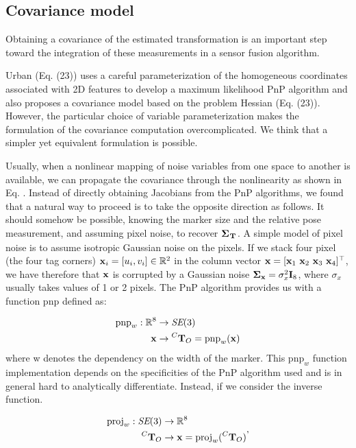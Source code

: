 \subsection{Covariance model}
\label{sec:apritlag_covariance}
Obtaining a covariance of the estimated transformation is an important step toward the integration of these measurements in a sensor fusion algorithm.

Urban \cite{urban2016mlpnp} (Eq. (23)) uses a careful parameterization of the homogeneous coordinates associated with 2D features to develop
a maximum likelihood PnP algorithm and also proposes a covariance model based on the problem Hessian (Eq. (23)).  However, the particular choice of variable 
parameterization makes the formulation of the covariance computation overcomplicated.
We think that a simpler yet equivalent formulation is possible. 

Usually, when a nonlinear mapping of noise variables from one space to another is available, we can propagate the covariance through the nonlinearity
as shown in Eq. . 
Instead of directly obtaining Jacobians from the PnP algorithms, we found that a natural way to proceed is to take the opposite 
direction as follows. It should somehow be possible, knowing the marker size and the relative pose measurement, and assuming pixel noise, to
recover ${\bm \Sigma}_{\prescript{}{}{{\bf T}}_{}}$. A simple model of pixel noise is to assume isotropic Gaussian noise on the pixels. If we stack four pixel (the four tag corners) 
${\bf x}_i = [u_i, v_i] \in \mathbb{R}^2$ in the column vector ${\bf x} = [{\bf x}_1~{\bf x}_2~{\bf x}_3~{\bf x}_4]^{\top}$, we have therefore that
${\bf x}$ is corrupted by a Gaussian noise ${\bm \Sigma}_{{\bf x}} = \sigma_{x}^2 {\bf I}_8$, where $\sigma_{x}$ usually takes values of 1 or 2 pixels.
The PnP algorithm provides us with a function $\text{pnp}$ defined as:

\begin{equation}
    \begin{split}
        \text{pnp}_w: \mathbb{R}^8 &\rightarrow \textit{SE}(3) \\
                           {\bf x} &\rightarrow \prescript{C}{}{{\bf T}}_{O} = \text{pnp}_w({\bf x})
    \end{split}
\end{equation}
%
where w denotes the dependency on the width of the marker. This $\text{pnp}_w$ function implementation depends on the specificities of the PnP algorithm used and  
is in general hard to analytically differentiate. Instead, if we consider the inverse function.

\begin{equation}
    \begin{split}
        \text{proj}_w: \textit{SE}(3) &\rightarrow \mathbb{R}^8 \\
                           \prescript{C}{}{{\bf T}}_{O} &\rightarrow {\bf x} = \text{proj}_w(\prescript{C}{}{{\bf T}}_{O})
    \end{split},
\end{equation}

